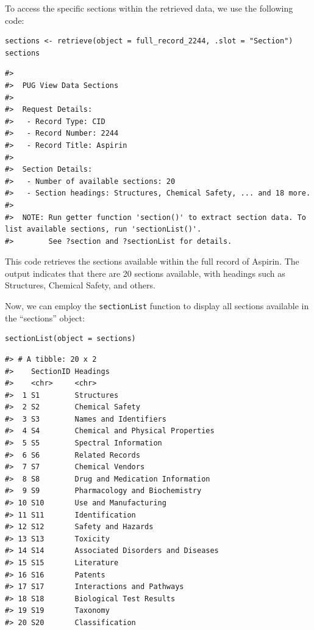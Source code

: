 To access the specific sections within the retrieved data, we use the following code:

\begin{verbatim}
sections <- retrieve(object = full_record_2244, .slot = "Section")
sections
\end{verbatim}

\begin{verbatim}
#> 
#>  PUG View Data Sections 
#> 
#>  Request Details: 
#>   - Record Type: CID
#>   - Record Number: 2244
#>   - Record Title: Aspirin
#> 
#>  Section Details: 
#>   - Number of available sections: 20
#>   - Section headings: Structures, Chemical Safety, ... and 18 more.
#> 
#>  NOTE: Run getter function 'section()' to extract section data. To list available sections, run 'sectionList()'. 
#>        See ?section and ?sectionList for details.
\end{verbatim}

This code retrieves the sections available within the full record of Aspirin. The output indicates that there are 20 sections available, with headings such as Structures, Chemical Safety, and others.

Now, we can employ the \texttt{sectionList} function to display all sections available in the ``sections'' object:

\begin{verbatim}
sectionList(object = sections)
\end{verbatim}

\begin{verbatim}
#> # A tibble: 20 x 2
#>    SectionID Headings                         
#>    <chr>     <chr>                            
#>  1 S1        Structures                       
#>  2 S2        Chemical Safety                  
#>  3 S3        Names and Identifiers            
#>  4 S4        Chemical and Physical Properties 
#>  5 S5        Spectral Information             
#>  6 S6        Related Records                  
#>  7 S7        Chemical Vendors                 
#>  8 S8        Drug and Medication Information  
#>  9 S9        Pharmacology and Biochemistry    
#> 10 S10       Use and Manufacturing            
#> 11 S11       Identification                   
#> 12 S12       Safety and Hazards               
#> 13 S13       Toxicity                         
#> 14 S14       Associated Disorders and Diseases
#> 15 S15       Literature                       
#> 16 S16       Patents                          
#> 17 S17       Interactions and Pathways        
#> 18 S18       Biological Test Results          
#> 19 S19       Taxonomy                         
#> 20 S20       Classification
\end{verbatim}

